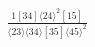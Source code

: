 \documentclass[varwidth, border=5pt]{standalone}
\begin{document}
\begin{my}
$\begin{gathered}
\scriptscriptstyle\frac{1[34]⟨24⟩^2[15]}{⟨23⟩⟨34⟩[35]⟨45⟩^2}
\end{gathered}$
\end{my}
\end{document}
